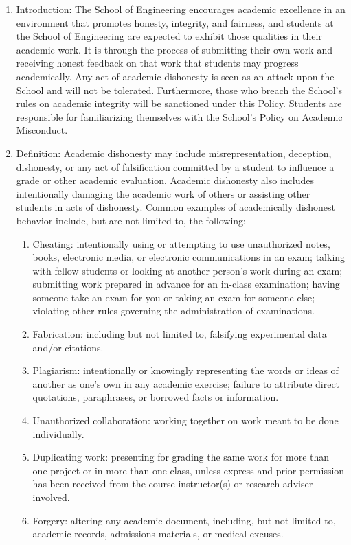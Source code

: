 \documentclass[10pt]{article}
\begin{document}
\begin{enumerate}[label=\Alph*.]\itemsep0em 
	
	\item Introduction: The School of Engineering encourages academic excellence in an environment that promotes honesty, integrity, and fairness, and students at the School of Engineering are expected to exhibit those qualities in their academic work. It is through the process of submitting their own work and receiving honest feedback on that work that students may progress academically. Any act of academic dishonesty is seen as an attack upon the School and will not be tolerated. Furthermore, those who breach the School’s rules on academic integrity will be sanctioned under this Policy. Students are responsible for familiarizing themselves with the School’s Policy on Academic Misconduct.
	
	\item	Definition: Academic dishonesty may include misrepresentation, deception, dishonesty, or any act of falsification committed by a student to influence a grade or other academic evaluation. Academic dishonesty also includes intentionally damaging the academic work of others or assisting other students in acts of dishonesty. Common examples of academically dishonest behavior include, but are not limited to, the following:
	\begin{enumerate}[label=\arabic*.]\itemsep0em 
		\item	Cheating: intentionally using or attempting to use unauthorized notes, books, electronic media, or electronic communications in an exam; talking with fellow students or looking at another person’s work during an exam; submitting work prepared in advance for an in-class examination; having someone take an exam for you or taking an exam for someone else; violating other rules governing the administration of examinations.
		\item	Fabrication:  including but not limited to, falsifying experimental data and/or citations.
		\item	Plagiarism: intentionally or knowingly representing the words or ideas of another as one’s own in any academic exercise; failure to attribute direct quotations, paraphrases, or borrowed facts or information. 
		\item	Unauthorized collaboration: working together on work meant to be done individually.
		\item	Duplicating work: presenting for grading the same work for more than one project or in more than one class, unless express and prior permission has been received from the course instructor(s) or research adviser involved. 
		\item	Forgery: altering any academic document, including, but not limited to, academic records, admissions materials, or medical excuses.
	\end{enumerate}
\end{enumerate}
\end{document}
